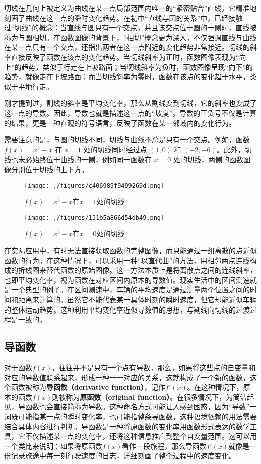 切线在几何上被定义为曲线在某一点局部范围内唯一的“紧密贴合”直线，它精准地刻画了曲线在这一点的瞬时变化趋势。在初中“直线与圆的关系”中，已经接触过“切线”的概念：当直线与圆只有一个交点，并且该交点位于圆的一侧时，直线被称为与圆相切。在函数图像的背景下，“相切”概念更为深入，不仅强调直线与曲线在某一点只有一个交点，还指出两者在这一点附近的变化趋势非常接近。切线的斜率直接反映了函数在该点的变化趋势。当切线斜率为正时，函数图像表现为“向上”的趋势，类似于行走在上坡路面；当切线斜率为负时，函数图像呈现“向下”的趋势，就像走在下坡路面；而当切线斜率为零时，函数在该点的变化趋于水平，类似于平地行走。

刚才提到过，割线的斜率是平均变化率，那么从割线变到切线，它的斜率也变成了这一点的导数。因此，导数也就是描述这一点的“坡度”。导数的正负号不仅是计算的结果，更是一种直观的符号语言，反映了函数在某一邻域内的变化行为。

需要注意的是，与圆的切线不同，切线与曲线不总是只有一个交点。例如，函数 $f(x) = x^3 - x$ 在 $x = 1$ 处的切线同时经过点 $(1, 0)$ 和 $(-2, -6)$。此外，切线也未必始终位于曲线的一侧，例如同一函数在 $x = 0$ 处的切线，两侧的函数图像分别位于切线的上下方。

\begin{figure}[ht]
\centering
\texttt{[image: ./figures/c406989f9499269d.png]}
\caption{$f(x)=x^3-x$在$x=1$处的切线} \label{fig_HsDerv_1}
\end{figure}

\begin{figure}[ht]
\centering
\texttt{[image: ./figures/131b5a866d54db49.png]}
\caption{$f(x)=x^3-x$在$x=0$处的切线} \label{fig_HsDerv_2}
\end{figure}

在实际应用中，有时无法直接获取函数的完整图像，而只能通过一组离散的点近似函数的行为。在这种情况下，可以采用一种“以直代曲”的方法，用相邻两点连线构成的折线图来替代函数的原始图像。这一方法本质上是将离散点之间的连线斜率，也即平均变化率，视为函数在对应区间内原本的导数值。现实生活中的区间测速就是一个典型的例子。在区间测速中，车辆的平均速度是通过测量两个位置之间的时间和距离来计算的。虽然它不能代表某一具体时刻的瞬时速度，但它却能近似车辆的整体运动趋势。这种利用平均变化率近似导数值的思想，与割线向切线的过渡过程是一致的。

\subsection{导函数}

对于函数$f(x)$，往往并不是只有一个点有导数，那么，如果将这些点的自变量和对应的导数值联系起来，形成一种一一对应的关系，这就构成了一个新的函数，这个函数被称为\textbf{导函数（derivative function）}，记作$f'(x)$。在这种情况下，原本的函数$f(x)$则被称为\textbf{原函数（original function）}。在很多情况下，为简洁起见，导函数也会直接简称为导数。这种命名方式可能让人感到困惑，因为“导数”一词既可能指某一点的瞬时变化率，也可能指整条导函数，这种语境依赖的用法需要结合具体内容进行判断。导函数是一种将原函数的变化率用函数形式表达的数学工具，它不仅描述某一点的变化率，还将这种信息推广到整个自变量范围。这可以用一个类比来说明：如果将原函数$f(x)$看作一段旅程，那么导函数$f'(x)$就像是一份记录旅途中每一刻行驶速度的日志，详细刻画了整个过程中的速度变化。

